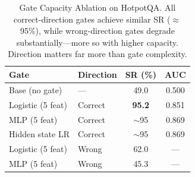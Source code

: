 \begin{table}[t]
\centering
\caption{Gate Capacity Ablation on HotpotQA. All correct-direction gates achieve similar SR ($\approx$95\%),
while wrong-direction gates degrade substantially---more so with higher capacity.
Direction matters far more than gate complexity.}
\label{tab:capacity}
\begin{tabular}{llcc}
\toprule
\textbf{Gate} & \textbf{Direction} & \textbf{SR (\%)} & \textbf{AUC} \\
\midrule
Base (no gate) & --- & 49.0 & 0.500 \\
\midrule
Logistic (5 feat) & Correct & \textbf{95.2} & 0.851 \\
MLP (5 feat) & Correct & $\sim$95 & 0.869 \\
Hidden state LR & Correct & $\sim$95 & 0.869 \\
\midrule
Logistic (5 feat) & Wrong & 62.0 & --- \\
MLP (5 feat) & Wrong & 45.3 & --- \\
\bottomrule
\end{tabular}
\end{table}